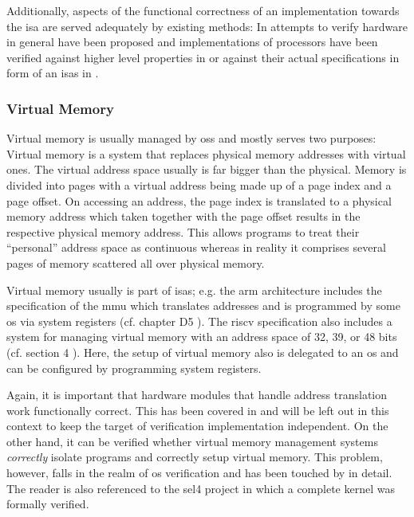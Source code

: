 Additionally, aspects of the functional correctness of an implementation towards the \gls{isa} are served adequately by existing methods:
In \cite{Mukherjee16} attempts to verify hardware in general have been proposed and implementations of processors have been verified against higher level properties in \cite{Zhang15, Beatty94, Berezin98, Trippel19} or against their actual specifications in form of an \glspl{isa} in \cite{Burch94, Reid16, RISCV-formal}.

\subsubsection{Virtual Memory}

Virtual memory is usually managed by \glspl{os} and mostly serves two purposes: 
Virtual memory is a system that replaces physical memory addresses with virtual ones.
The virtual address space usually is far bigger than the physical.
Memory is divided into pages with a virtual address being made up of a page index and a page offset.
On accessing an address, the page index is translated to a physical memory address which taken together with the page offset results in the respective physical memory address.
This allows programs to treat their \enquote{personal} address space as continuous whereas in reality it comprises several pages of memory scattered all over physical memory.

Virtual memory usually is part of \glspl{isa}; e.g. the \gls{arm} architecture includes the specification of the \gls{mmu} which translates addresses and is programmed by some \gls{os} via system registers (cf. chapter D5 \cite{Armv8}).
The \gls{riscv} specification also includes a system for managing virtual memory with an address space of 32, 39, or 48 bits (cf. section 4 \cite{RiscVISAP}).
Here, the setup of virtual memory also is delegated to an \gls{os} and can be configured by programming system registers.

Again, it is important that hardware modules that handle address translation work functionally correct.
This has been covered in \cite{Dalinger05} and will be left out in this context to keep the target of verification implementation independent.
On the other hand, it can be verified whether virtual memory management systems \textit{correctly} isolate programs and correctly setup virtual memory.
This problem, however, falls in the realm of \gls{os} verification and has been touched by \cite{Vaynberg12} in detail.
The reader is also referenced to the sel4 project \cite{Klein09} in which a complete kernel was formally verified.

